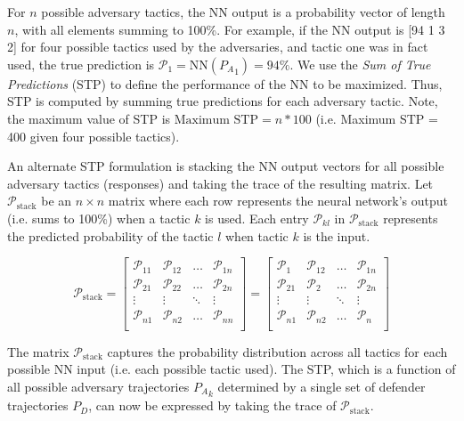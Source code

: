 \documentclass[journal]{IEEEtran} %
\begin{document}
For \( n \) possible adversary tactics, the NN output is a probability vector of length \( n \), with all elements summing to 100\%. For example, if the NN output is [94 1 3 2] for four possible  tactics used by the adversaries, and tactic one was in fact used, the true prediction is \( \mathcal{P}_1 = \text{NN}({P_A}_1) = 94\% \). We use the \textit{Sum of True Predictions} (STP) to define the performance of the NN to be maximized. Thus, STP is computed by summing  true predictions for each  adversary tactic. Note, the maximum value of STP is \( \text{Maximum STP} = n*100 \) (i.e. Maximum STP = 400 given four possible tactics).

An alternate STP formulation is stacking the NN output vectors for all possible adversary tactics (responses) and taking the trace of the resulting matrix. Let \( \mathcal{P}_{\text{stack}} \) be an \( n \times n \) matrix where each row represents the neural network’s output (i.e. sums to 100\%) when a  tactic \( k \) is used. Each entry \( \mathcal{P}_{kl} \) in \(\mathcal{P}_{\text{stack}} \) represents the predicted probability of the tactic \( l \) when tactic \( k \) is the input.

\[
\mathcal{P}_{\text{stack}} = 
\begin{bmatrix}
\mathcal{P}_{11} & \mathcal{P}_{12} & \dots & \mathcal{P}_{1n} \\
\mathcal{P}_{21} & \mathcal{P}_{22} & \dots & \mathcal{P}_{2n} \\
\vdots & \vdots & \ddots & \vdots \\
\mathcal{P}_{n1} & \mathcal{P}_{n2} & \dots & \mathcal{P}_{nn} \\
\end{bmatrix} =
\begin{bmatrix}
\mathcal{P}_{1} & \mathcal{P}_{12} & \dots & \mathcal{P}_{1n} \\
\mathcal{P}_{21} & \mathcal{P}_{2} & \dots & \mathcal{P}_{2n} \\
\vdots & \vdots & \ddots & \vdots \\
\mathcal{P}_{n1} & \mathcal{P}_{n2} & \dots & \mathcal{P}_{n} \\
\end{bmatrix}
\]

The matrix \( \mathcal{P}_{\text{stack}} \) captures the probability distribution across all tactics for each possible NN input (i.e. each possible tactic used). The STP, which is a function of all possible adversary trajectories \( {P_A}_k \) determined by a single set of defender trajectories \( P_D \), can now be expressed by taking the trace of \( \mathcal{P}_{\text{stack}} \).
\end{document}
